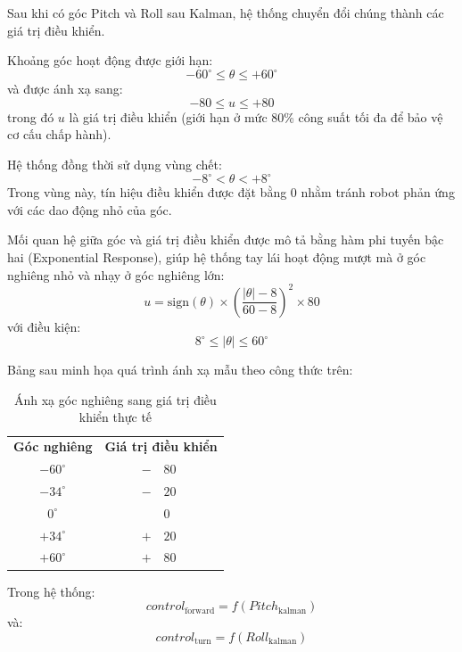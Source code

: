 Sau khi có góc Pitch và Roll sau Kalman, hệ thống chuyển đổi chúng thành các giá trị điều khiển.

Khoảng góc hoạt động được giới hạn:
\begin{equation}
-60^\circ \leq \theta \leq +60^\circ
\end{equation}
và được ánh xạ sang:
\begin{equation}
-80 \leq u \leq +80
\end{equation}
trong đó $u$ là giá trị điều khiển (giới hạn ở mức 80\% công suất tối đa để bảo vệ cơ cấu chấp hành).

Hệ thống đồng thời sử dụng vùng chết:
\begin{equation}
-8^\circ < \theta < +8^\circ
\end{equation}
Trong vùng này, tín hiệu điều khiển được đặt bằng 0 nhằm tránh robot phản ứng với các dao động nhỏ của góc.

Mối quan hệ giữa góc và giá trị điều khiển được mô tả bằng hàm phi tuyến bậc hai (Exponential Response), giúp hệ thống tay lái hoạt động mượt mà ở góc nghiêng nhỏ và nhạy ở góc nghiêng lớn:
\begin{equation}
u = \mathrm{sign}(\theta) \times \left( \frac{|\theta| - 8}{60 - 8} \right)^2 \times 80
\end{equation}
với điều kiện:
\begin{equation}
8^\circ \leq |\theta| \leq 60^\circ
\end{equation}

Bảng sau minh họa quá trình ánh xạ mẫu theo công thức trên:
\begin{table}[H]
    \centering
    \renewcommand{\arraystretch}{1.3}
    \caption{Ánh xạ góc nghiêng sang giá trị điều khiển thực tế}
    \label{tab:angle-control}
    \begin{tabular}{c r @{} l}
        \toprule
        \textbf{Góc nghiêng} & \multicolumn{2}{c}{\textbf{Giá trị điều khiển}} \\
        \centering
        $-60^\circ$ & $-$ & $80$ \\
        $-34^\circ$ & $-$ & $20$ \\
        $0^\circ$ & & $0$ \\
        $+34^\circ$ & $+$ & $20$ \\
        $+60^\circ$ & $+$ & $80$ \\
        \bottomrule
    \end{tabular}
\end{table}

Trong hệ thống:
\begin{equation}
control_{\text{forward}}
=
f(Pitch_{\text{kalman}})
\end{equation}
và:
\begin{equation}
control_{\text{turn}}
=
f(Roll_{\text{kalman}})
\end{equation}

